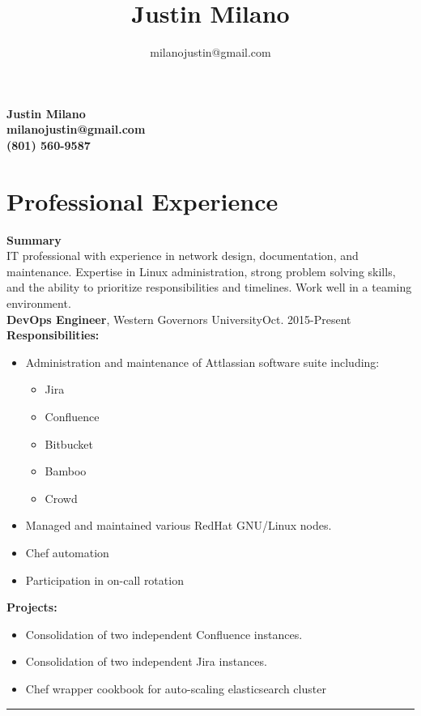 \documentclass[10pt]{article}
\title{\bfseries\Huge Justin Milano}
\author{milanojustin@gmail.com}
\date{}
\newenvironment{myitemize}
{ \begin{itemize}[topsep=0pt]
  	\vspace{-4pt}
    \setlength{\itemsep}{0pt}
    \setlength{\parskip}{0pt}
    \setlength{\parsep}{0pt}     }
{ \end{itemize}                  }
\newcommand{\breakrule}{
  	\color{lightgray}
  	\vspace{-4pt}
	\begin{center}
		\noindent\rule{7cm}{0.5pt}
	\end{center}
	}
\begin{document}
\begin{center}
	{\bf \Huge Justin Milano}\\
	\vspace{5pt}
	{\bf \large milanojustin@gmail.com}\\
  {\bf \large (801) 560-9587}
\end{center}
\vspace{-5pt}
\section*{Professional Experience}

\noindent
{\large {\bf Summary}} \\
IT professional with experience in network design, documentation, and maintenance. Expertise in Linux administration, strong problem solving skills, and the ability to prioritize responsibilities and timelines. Work well in a teaming environment. \\

\noindent
{\large {\bf DevOps Engineer}, Western Governors University\hfill Oct. 2015-Present } \\
{\bf Responsibilities:}
\begin{myitemize}
  \item Administration and maintenance of Attlassian software suite including:
    \begin{itemize}
      \item Jira
      \item Confluence
      \item Bitbucket
      \item Bamboo
      \item Crowd
    \end{itemize}
  \item Managed and maintained various RedHat GNU/Linux nodes.
  \item Chef automation
  \item Participation in on-call rotation
\end{myitemize} 
{\bf Projects:}
\begin{myitemize}
  \item Consolidation of two independent Confluence instances.
  \item Consolidation of two independent Jira instances.
  \item Chef wrapper cookbook for auto-scaling elasticsearch cluster
\end{myitemize} 
{\breakrule}
\end{document}
